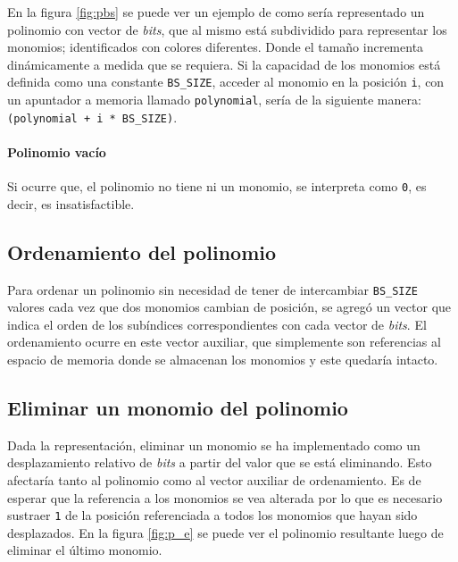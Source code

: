 En la figura \ref{fig:pbs} se puede ver un ejemplo de como sería representado un polinomio con vector de \textit{bits}, que al mismo está subdividido para representar los monomios; identificados con colores diferentes. Donde el tamaño incrementa dinámicamente a medida que se requiera. Si la capacidad de los monomios está definida como una constante \texttt{BS\_SIZE}, acceder al monomio en la posición \texttt{i}, con un apuntador a memoria llamado \texttt{polynomial}, sería de la siguiente manera: \texttt{(polynomial + i * BS\_SIZE)}.

\paragraph{Polinomio vacío} Si ocurre que, el polinomio no tiene ni un monomio, se interpreta como \texttt{0}, es decir, es insatisfactible.

\subsection{Ordenamiento del polinomio}

Para ordenar un polinomio sin necesidad de tener de intercambiar \texttt{BS\_SIZE} valores cada vez que dos monomios cambian de posición, se agregó un vector que indica el orden de los subíndices correspondientes con cada vector de \textit{bits}. El ordenamiento ocurre en este vector auxiliar, que simplemente son referencias al espacio de memoria donde se almacenan los monomios y este quedaría intacto.

\subsection{Eliminar un monomio del polinomio}

Dada la representación, eliminar un monomio se ha implementado como un desplazamiento relativo de \textit{bits} a partir del valor que se está eliminando. Esto afectaría tanto al polinomio como al vector auxiliar de ordenamiento. Es de esperar que la referencia a los monomios se vea alterada por lo que es necesario sustraer \texttt{1} de la posición referenciada a todos los monomios que hayan sido desplazados. En la figura \ref{fig:p_e} se puede ver el polinomio resultante luego de eliminar el último monomio.

